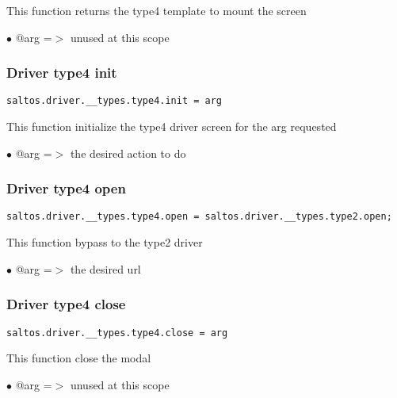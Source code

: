 \documentclass[a4paper]{article}
\begin{document}
This function returns the type4 template to mount the screen

\begin{compactitem}
\item[\color{myblue}$\bullet$] @arg =$>$ unused at this scope
\end{compactitem}

\hypertarget{toc756}{}
\subsubsection{Driver type4 init}

\begin{lstlisting}
saltos.driver.__types.type4.init = arg
\end{lstlisting}

This function initialize the type4 driver screen for the arg requested

\begin{compactitem}
\item[\color{myblue}$\bullet$] @arg =$>$ the desired action to do
\end{compactitem}

\hypertarget{toc757}{}
\subsubsection{Driver type4 open}

\begin{lstlisting}
saltos.driver.__types.type4.open = saltos.driver.__types.type2.open;
\end{lstlisting}

This function bypass to the type2 driver

\begin{compactitem}
\item[\color{myblue}$\bullet$] @arg =$>$ the desired url
\end{compactitem}

\hypertarget{toc758}{}
\subsubsection{Driver type4 close}

\begin{lstlisting}
saltos.driver.__types.type4.close = arg
\end{lstlisting}

This function close the modal

\begin{compactitem}
\item[\color{myblue}$\bullet$] @arg =$>$ unused at this scope
\end{compactitem}
\end{document}
